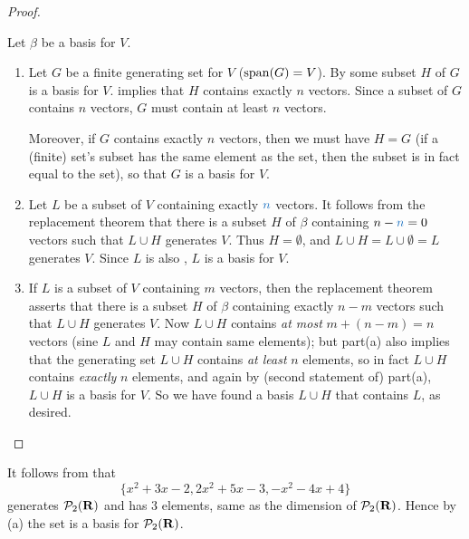\begin{proof}\ 

Let \(\beta\) be a basis for \(V\).
\begin{enumerate}
\item Let \(G\) be a finite generating set for \(V\) (\(\operatorname{span}(G) = V\)).
    By  some subset \(H\) of \(G\) is a basis for \(V\).  implies that \(H\) contains exactly \(n\) vectors.
    Since a subset of \(G\) contains \(n\) vectors, \(G\) must contain at least \(n\) vectors.
    
    Moreover, if \(G\) contains exactly \(n\) vectors, then we must have \(H = G\) (if a (finite) set's subset has the same element as the set, then the subset is in fact equal to the set), so that \(G\) is a basis for \(V\).
\item Let \(L\) be a \LID{} subset of \(V\) containing exactly \(\BLUE{n}\) vectors.
    It follows from the replacement theorem  that there is a subset \(H\) of \(\beta\) containing \(n - \BLUE{n} = 0\) vectors such that \(L \cup H\) generates \(V\).
    Thus \(H = \emptyset\), and \(L \cup H = L \cup \emptyset = L\) generates \(V\). Since \(L\) is also \LID{}, \(L\) is a basis for \(V\).
\item If \(L\) is a \LID{} subset of \(V\) containing \(m\) vectors, then the replacement theorem  asserts that there is a subset \(H\) of \(\beta\) containing exactly \(n - m\) vectors such that \(L \cup H\) generates \(V\).
    Now \(L \cup H\) contains \emph{at most} \(m + (n - m) = n\) vectors (sine \(L\) and \(H\) may contain same elements);
    but part(a) also implies that the generating set \(L \cup H\) contains \emph{at least} \(n\) elements, so in fact \(L \cup H\) contains \emph{exactly} \(n\) elements, and again by (second statement of) part(a), \(L \cup H\) is a basis for \(V\).
    So we have found a basis \(L \cup H\) that contains \(L\), as desired.
\end{enumerate}
\end{proof}

\begin{example} \label{1.6.14}
It follows from  that
\[
    \{ x^2 + 3x - 2, 2x^2 + 5x - 3, -x^2 -4x + 4 \}
\]
generates \(\mathcal{P}_2(\mathbf{R})\) and has \(3\) elements, same as the dimension of \(\mathcal{P}_2(\mathbf{R})\).
Hence by (a) the set is a basis for \(\mathcal{P}_2(\mathbf{R})\).
\end{example}

